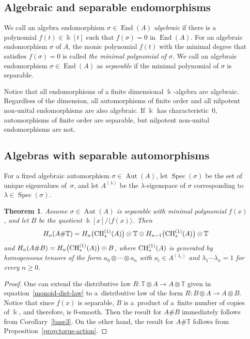 \documentclass[10pt,a4paper]{amsart}
\newcommand{\B}[1]{\mathbb{#1}}
\newcommand{\CH}{{\rm CH}}
\renewcommand{\geq}{\geqslant}
\numberwithin{equation}{section}
\newtheorem{Theorem}{Theorem}[section]
\begin{document}
\subsection{Algebraic and separable endomorphisms}

We call an algebra endomorphism $\sigma\in \operatorname{End}(A)$ \emph{algebraic} if there is a
polynomial $f(t)\in\Bbbk[t]$ such that $f(\sigma) = 0$ in $\operatorname{End}(A)$. For an algebraic
endomorphism $\sigma$ of $A$, the monic polynomial $f(t)$ with the minimal degree that
satisfies $f(\sigma)=0$ is called \emph{the minimal polynomial of $\sigma$.} We call an
algebraic endomorphism $\sigma\in \operatorname{End}(A)$ as \emph{separable} if the minimal polynomial of
$\sigma$ is separable.

Notice that all endomorphisms of a finite dimensional $\Bbbk$-algebra are algebraic.
Regardless of the dimension, all automorphisms of finite order and all nilpotent non-unital
endomorphisms are also algebraic. If $\Bbbk$ has characteristic~0, automorphisms of finite
order are separable, but nilpotent non-unital endomorphisms are not.

\subsection{Algebras with separable automorphisms}\label{sect:separable}

For a fixed algebraic automorphism $\sigma\in \operatorname{Aut}(A)$, let $\operatorname{Spec}(\sigma)$ be the set of
unique eigenvalues of~$\sigma$, and let $A^{(\lambda)}$ be the $\lambda$-eigenspace of
$\sigma$ corresponding to $\lambda \in \operatorname{Spec}(\sigma)$.


\begin{Theorem}\label{thm:separable}
 Assume $\sigma\in \operatorname{Aut}(A)$ is separable with minimal polynomial $f(x)$, and let
 $B$ be the quotient $\Bbbk[x]/\langle f(x)\rangle$. Then
 \[ H_n(A\# \B{T})
 = H_n\bigl(\CH_*^{(1)}(A)\bigr)\otimes\B{T} \oplus H_{n-1}\bigl(\CH_*^{(1)}(A)\bigr)\otimes \B{T}
 \] and
$ H_n(A\# B) = H_n\bigl(\CH_*^{(1)}(A)\bigr)\otimes B$, where $\CH_*^{(1)}(A)$ is generated by homogeneous tensors of the form
$a_0\otimes\cdots\otimes a_n$ with $ a_i\in A^{(\lambda_i)}
$ and $\lambda_1\cdots\lambda_n=1
$ for every $n\geq 0$.
\end{Theorem}



\begin{proof}
 One can extend the distributive law $R\colon \B{T}\otimes A\to A\otimes\B{T}$ given in
 equation~\eqref{monoid-dist-law} to a~distributive law of the form
 $R\colon B\otimes A\to A\otimes B$. Notice that since $f(x)$ is separable, $B$ is a~product of a~finite number of copies of $\Bbbk$, and therefore, is $0$-smooth. Then the result for $A\# B$
 immediately follows from Corollary~\ref{base3}. On the other hand, the result for $A\# \B{T}$
 follows from Proposition~\ref{prop:torus-action}.
\end{proof}
\end{document}
